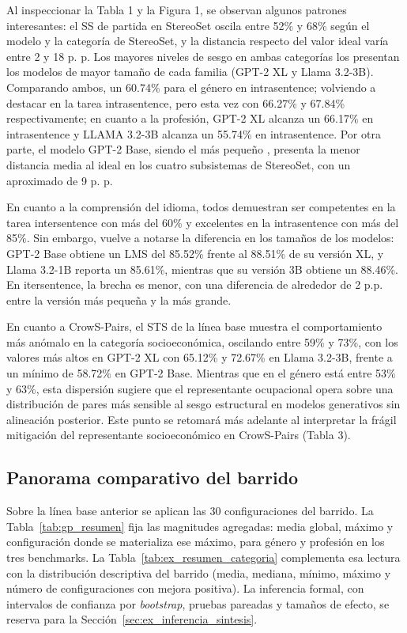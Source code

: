 \documentclass[12pt,a4paper]{report}
\begin{document}
Al inspeccionar la Tabla 1 y la Figura 1, se observan algunos patrones interesantes: el SS de partida en StereoSet oscila entre 52\% y 68\% según el modelo y la categoría de StereoSet, y la distancia respecto del valor ideal varía entre 2 y 18 p. p. Los mayores niveles de sesgo en ambas categorías los presentan los modelos de mayor tamaño de cada familia (GPT-2 XL y Llama 3.2-3B). Comparando ambos, un 60.74\% para el género en intrasentence; volviendo a destacar en la tarea intrasentence, pero esta vez con 66.27\% y 67.84\% respectivamente; en cuanto a la profesión, GPT-2 XL alcanza un 66.17\% en intrasentence y LLAMA 3.2-3B alcanza un 55.74\% en intrasentence. Por otra parte, el modelo GPT-2 Base, siendo el más pequeño , presenta la menor distancia media al ideal en los cuatro subsistemas de StereoSet, con un aproximado de 9 p. p.

En cuanto a la comprensión del idioma, todos demuestran ser competentes en la tarea intersentence con más del 60\% y excelentes en la intrasentence con más del 85\%. Sin embargo, vuelve a notarse la diferencia en los tamaños de los modelos: GPT-2 Base obtiene un LMS del 85.52\% frente al 88.51\% de su versión  XL, y Llama 3.2-1B reporta un 85.61\%, mientras que su versión 3B obtiene un 88.46\%. En itersentence, la brecha es menor, con una diferencia de alrededor de 2 p.p. entre la versión más pequeña y la más grande.

En cuanto a CrowS-Pairs, el STS de la línea base muestra el comportamiento más anómalo en la categoría socioeconómica, oscilando entre 59\% y 73\%, con los valores más altos en GPT-2 XL con 65.12\% y 72.67\% en Llama  3.2-3B, frente a un mínimo de 58.72\% en GPT-2 Base. Mientras que en el género está entre 53\% y 63\%, esta dispersión sugiere que el representante ocupacional opera sobre una distribución de pares más sensible al sesgo estructural en modelos generativos sin alineación posterior. Este punto se retomará más adelante al interpretar la frágil mitigación del representante socioeconómico en CrowS-Pairs (Tabla 3).
\subsection{Panorama comparativo del barrido}
\label{subsec:ex_panorama}

Sobre la línea base anterior se aplican las 30 configuraciones del barrido. La Tabla~\ref{tab:gp_resumen} fija las magnitudes agregadas: media global, máximo y configuración donde se materializa ese máximo, para género y profesión en los tres benchmarks. La Tabla~\ref{tab:ex_resumen_categoria} complementa esa lectura con la distribución descriptiva del barrido (media, mediana, mínimo, máximo y número de configuraciones con mejora positiva). La inferencia formal, con intervalos de confianza por \textit{bootstrap}, pruebas pareadas y tamaños de efecto, se reserva para la Sección~\ref{sec:ex_inferencia_sintesis}.
\end{document}
